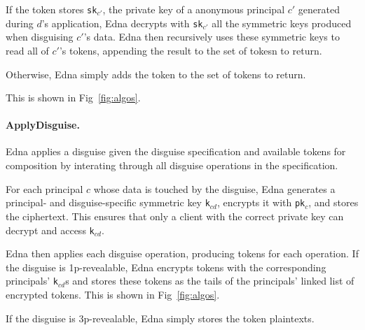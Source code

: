 If the token stores \texttt{sk}$_{c'}$, the private key of a
anonymous principal $c'$ generated during $d$'s application, Edna decrypts with \texttt{sk}$_{c'}$
all the symmetric keys produced when disguising $c'$'s data. Edna then recursively uses these
symmetric keys to read all of $c'$'s tokens, appending the result to the set of tokesn to
return.

Otherwise, Edna simply adds the token to the set of tokens to return. 

This is shown in Fig~\ref{fig:algos}.


\paragraph{ApplyDisguise.} Edna applies a disguise given the disguise specification and available tokens
for composition by interating through all disguise operations in the specification.

For each principal $c$ whose data is touched by the disguise, Edna generates a principal- and disguise-specific symmetric key \texttt{k}$_{cd}$, encrypts it with \texttt{pk}$_c$, and stores the ciphertext. This ensures that only a client with the correct private key can decrypt and access
\texttt{k}$_{cd}$. 

Edna then applies each disguise operation, producing tokens for each operation. If the disguise is
1p-revealable, Edna encrypts tokens with the corresponding principals' \texttt{k}$_{cd}$s and stores
these tokens as the tails of the principals' linked list of
encrypted tokens. This is shown in Fig~\ref{fig:algos}.

If the disguise is 3p-revealable, Edna simply stores the token plaintexts.


